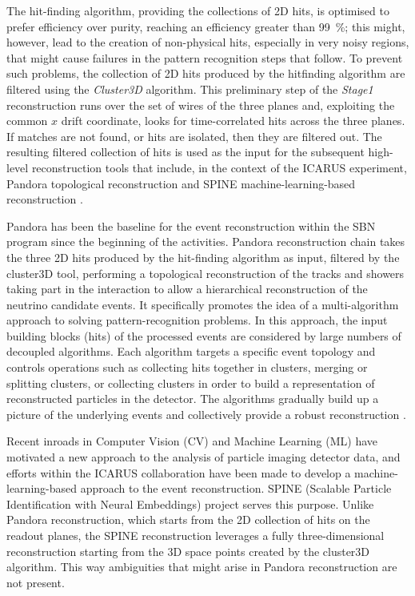 The hit-finding algorithm, providing the collections of 2D hits, is optimised to prefer efficiency over purity, reaching an efficiency greater than \SI{99}{\percent}; this might, however, lead to the creation of non-physical hits, especially in very noisy regions, that might cause failures in the pattern recognition steps that follow. To prevent such problems, the collection of 2D hits produced by the hitfinding algorithm are filtered using the \emph{Cluster3D} algorithm. This preliminary step of the \emph{Stage1} reconstruction runs over the set of wires of the three planes and, exploiting the common $x$ drift coordinate, looks for time-correlated hits across the three planes. If matches are not found, or hits are isolated, then they are filtered out. The resulting filtered collection of hits is used as the input for the subsequent high-level reconstruction tools that include, in the context of the ICARUS experiment, Pandora topological reconstruction \cite{MicroBooNE:2017xvs} and SPINE machine-learning-based reconstruction \cite{Drielsma:2021jdv}. 

Pandora has been the baseline for the event reconstruction within the SBN program since the beginning of the activities. Pandora reconstruction chain takes the three 2D hits produced by the hit-finding algorithm as input, filtered by the cluster3D tool, performing a topological reconstruction of the tracks and showers taking part in the interaction to allow a hierarchical reconstruction of the neutrino candidate events. It specifically promotes the idea of a multi-algorithm approach to solving pattern-recognition problems. In this approach, the input building blocks (hits) of the processed events are considered by large numbers of decoupled algorithms. Each algorithm targets a specific event topology and controls operations such as collecting hits together in clusters, merging or splitting clusters, or collecting clusters in order to build a representation of reconstructed particles in the detector. The algorithms gradually build up a picture of the underlying events and collectively provide a robust reconstruction \cite{MicroBooNE:2017xvs}. %


Recent inroads in Computer Vision (CV) and Machine Learning (ML) have motivated a new approach to the analysis of particle imaging detector data, and efforts within the ICARUS collaboration have been made to develop a machine-learning-based approach to the event reconstruction. SPINE (Scalable Particle Identification with Neural Embeddings) project serves this purpose. Unlike Pandora reconstruction, which starts from the 2D collection of hits on the readout planes, the SPINE reconstruction leverages a fully three-dimensional reconstruction starting from the 3D space points created by the cluster3D algorithm. This way ambiguities that might arise in Pandora reconstruction are not present.

